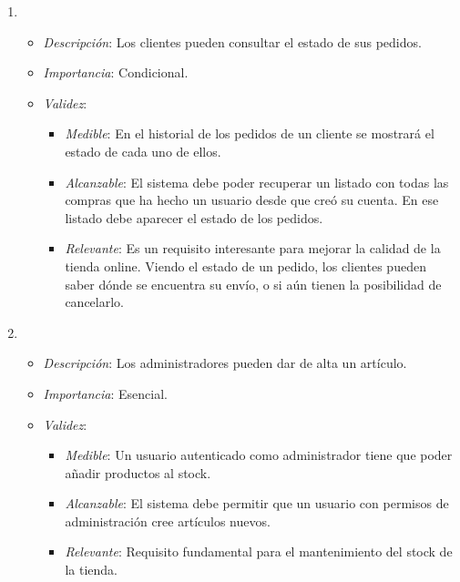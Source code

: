 \begin{enumerate}[{\bf RF-1}]
\item 
  \begin{itemize}
  \item \textit{Descripción}: Los clientes pueden consultar el estado de sus pedidos.
  \item \textit{Importancia}: Condicional.
  \item \textit{Validez}:
    \begin{itemize}
    \item \textit{Medible}: En el historial de los pedidos de un cliente se mostrará el estado de cada uno de ellos.
    \item \textit{Alcanzable}: El sistema debe poder recuperar un listado con todas las compras que ha hecho un usuario desde que creó su cuenta. En ese listado debe aparecer el estado de los pedidos.
    \item \textit{Relevante}: Es un requisito interesante para mejorar la calidad de la tienda online. Viendo el estado de un pedido, los clientes pueden saber dónde se encuentra su envío, o si aún tienen la posibilidad de cancelarlo.
    \end{itemize}
  \end{itemize}

\item 
  \begin{itemize}
  \item \textit{Descripción}: Los administradores pueden dar de alta un artículo.
  \item \textit{Importancia}: Esencial.
  \item \textit{Validez}:
    \begin{itemize}
    \item \textit{Medible}: Un usuario autenticado como administrador tiene que poder añadir productos al stock.
    \item \textit{Alcanzable}: El sistema debe permitir que un usuario con permisos de administración cree artículos nuevos.
    \item \textit{Relevante}: Requisito fundamental para el mantenimiento del stock de la tienda.
    \end{itemize}
  \end{itemize}


\end{enumerate}

